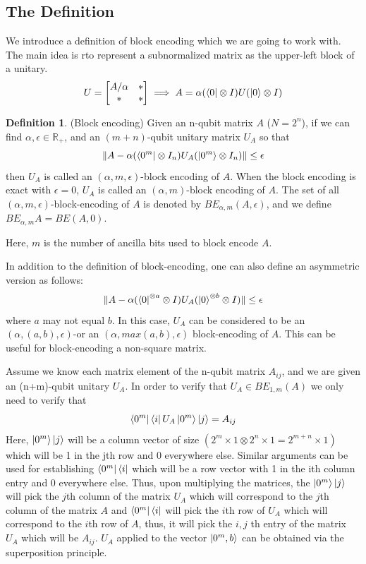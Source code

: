 \documentclass[12pt, oneside]{book}
\theoremstyle{definition}
\newtheorem{definition}{Definition}[section]
\theoremstyle{definition}
\theoremstyle{remark}
\begin{document}
\subsection{The Definition}
We introduce a definition of block encoding which we are going to work with. The main idea is rto represent a subnormalized matrix as the upper-left block of a unitary.
\[
U=\begin{bmatrix} A/\alpha & * \\ * & * \end{bmatrix} \implies A=\alpha(\bra{0}\otimes I)U(\ket{0}\otimes I)
\]
\begin{definition}
    (Block encoding) Given an n-qubit matrix $A$ ($N=2^n$), if we can find $\alpha,\epsilon \in \mathbb{R}_+$, and an $(m+n)$-qubit unitary matrix $U_A$ so that
    \[
    \|A-\alpha(\bra{0^m}\otimes I_n)U_A(\ket{0^m}\otimes I_n)\|\leq \epsilon
    \]
    then $U_A$ is called an $(\alpha,m,\epsilon)$-block encoding of $A$. When the block encoding is exact with $\epsilon=0$, $U_A$ is called an $(\alpha,m)$-block encoding of $A$. The set of all $(\alpha,m,\epsilon)$-block-encoding of $A$ is denoted by $BE_{\alpha,m}(A,\epsilon)$, and we define $BE_{\alpha,m}A=BE(A,0)$.
\end{definition}
Here, $m$ is the number of ancilla bits used to block encode $A$.
\begin{importantnote}
    In addition to the definition of block-encoding, one can also define an asymmetric version as follows:
    \[
    \|A-\alpha(\bra{0}^{\otimes a}\otimes I)U_A(\ket{0}^{\otimes b}\otimes I)\|\leq \epsilon
    \]
    where $a$ may not equal $b$. In this case, $U_A$ can be considered to be an $(\alpha,(a,b),\epsilon)$-or an $(\alpha,max(a,b),\epsilon)$ block-encoding of $A$. This can be useful for block-encoding a non-square matrix.
\end{importantnote}

Assume we know each matrix element of the n-qubit matrix $A_{ij}$, and we are given an (n+m)-qubit unitary $U_A$. In order to verify that $U_A \in BE_{1,m}(A)$ we only need to verify that
\[
\bra{0^m}\bra{i}U_A\ket{0^m}\ket{j}=A_{ij}
\]
Here, $\ket{0^m}\ket{j}$ will be a column vector of size $(2^m \times 1 \otimes  2^n \times 1= 2^{m+n} \times 1)$ which will be 1 in the jth row and 0 everywhere else. Similar arguments can be used for establishing $\bra{0^m}\bra{i}$ which will be a row vector with 1 in the ith column entry and 0 everywhere else. Thus, upon multiplying the matrices, the $\ket{0^m}\ket{j}$ will pick the $j$th column of the matrix $U_A$ which will correspond to the $j$th column of the matrix $A$ and $\bra{0^m}\bra{i}$ will pick the $i$th row of $U_A$ which will correspond to the $i$th row of $A$, thus, it will pick the $i,j$ th entry of the matrix $U_A$ which will be $A_{ij}$. $U_A$ applied to the vector $\ket{0^m,b}$ can be obtained via the superposition principle.
\end{document}
